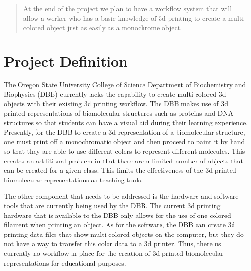 \documentclass[letterpaper, onecolumn, draftclsnofoot, 10pt, compsoc]{IEEEtran}
\begin{document}
\begin{titlepage}
\begin{singlespace}
\begin{abstract}
            At the end of the project we plan to have a workflow system that will allow a worker who has a basic knowledge of 3d printing to create a multi-colored object just as easily as a monochrome object.
        \end{abstract}     
    \end{singlespace}
\end{titlepage}
\newpage
{}
\tableofcontents
\clearpage

\section{Project Definition}
    \begin{singlespace}
        The Oregon State University College of Science Department of Biochemistry and Biophysics (DBB) currently lacks the capability to create multi-colored 3d objects with their existing 3d printing workflow. The DBB makes use of 3d printed representations of biomolecular structures such as proteins and DNA structures so that students can have a visual aid during their learning experience. Presently, for the DBB to create a 3d representation of a biomolecular structure, one must print off a monochromatic object and then proceed to paint it by hand so that they are able to use different colors to represent different molecules. This creates an additional problem in that there are a limited number of objects that can be created for a given class. This limits the effectiveness of the 3d printed biomolecular representations as teaching tools.\par
        The other component that needs to be addressed is the hardware and software tools that are currently being used by the DBB. The current 3d printing hardware that is available to the DBB only allows for the use of one colored filament when printing an object. As for the software, the DBB can create 3d printing data files that show multi-colored objects on the computer, but they do not have a way to transfer this color data to a 3d printer. Thus, there us currently no workflow in place for the creation of 3d printed biomolecular representations for educational purposes.
    \end{singlespace}
\end{document}
